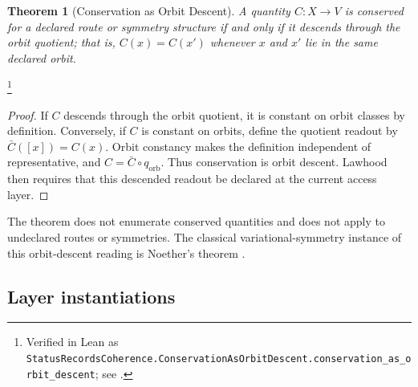 \documentclass[11pt]{article}
\newtheorem{theorem}{Theorem}[section]
\theoremstyle{definition}
\begin{document}
\begin{theorem}[Conservation as Orbit Descent]\label{thm:F27}
A quantity \(C:X\to V\) is conserved for a declared route or symmetry
structure if and only if it descends through the orbit quotient; that
is, \(C(x)=C(x')\) whenever \(x\) and \(x'\) lie in the same declared
orbit.
\end{theorem}
\footnote{\raggedright Verified in Lean as
\texttt{StatusRecordsCoherence.ConservationAsOrbitDescent.\allowbreak{}conservation\_as\_orbit\_descent};
see .}
\begin{proof}
If \(C\) descends through the orbit quotient, it is constant on orbit
classes by definition.  Conversely, if \(C\) is constant on orbits,
define the quotient readout by \(\bar C([x])=C(x)\).  Orbit constancy
makes the definition independent of representative, and
\(C=\bar C\circ q_{\mathrm{orb}}\).  Thus conservation is orbit
descent.  Lawhood then requires that this descended readout be
declared at the current access layer.
\end{proof}

The theorem does not enumerate conserved quantities and does not
apply to undeclared routes or symmetries.  The classical
variational-symmetry instance of this orbit-descent reading is
Noether's theorem \citep{Noether1918Invariante}.

\subsection*{Layer instantiations}\label{layer-inst:F27}
\end{document}
